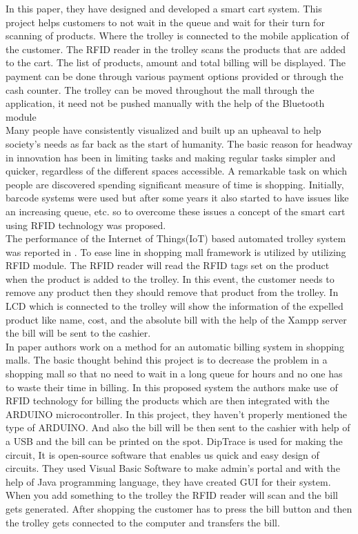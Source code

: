 \documentclass[conference]{IEEEtran}
\begin{document}
In this paper\cite{b8}, they have designed and developed a smart cart system. This project helps customers to not wait in the queue and wait for their turn for scanning of products. Where the trolley is connected 
to the mobile application of the customer. The RFID reader in the trolley scans the products that are added to the cart. The list of products, amount and total billing will be displayed. The payment can be done 
through various payment options provided or through the cash counter. The trolley can be moved throughout the mall through the application, it need not be pushed manually with the help of the Bluetooth module\\

Many people have consistently visualized and built up an upheaval to help society's needs as far back as the start of humanity. The basic reason for headway in innovation has been in limiting tasks and making regular tasks simpler and quicker, regardless of the different spaces accessible. A remarkable task on which people are discovered spending significant measure of time is shopping. Initially, barcode systems were used but after some years it also started to have issues like an increasing queue, etc. so to overcome these issues a concept of the smart cart using RFID technology was proposed.\\

The performance of the Internet of Things(IoT) based automated trolley system was reported in \cite{b9}. To ease line in shopping mall framework is utilized by utilizing RFID module. The RFID reader will read the RFID tags set on the product when the product is added to the trolley. In this event, the customer needs to remove any product then they should remove that product from the trolley. In LCD which is connected to the trolley will show the information of the expelled product like name, cost, and the absolute bill with the help of the Xampp server the bill will be sent to the cashier.\\


In paper\cite{b10} authors work on a method for an automatic billing system in shopping malls. The basic thought behind this project is to decrease the problem in a shopping mall so that no need to wait in a long queue for hours and no one has to waste their time in billing. In this proposed system the authors make use of RFID technology for billing the products which are then integrated with the ARDUINO microcontroller. In this project, they haven't properly mentioned the type of ARDUINO. And also the bill will be then sent to the cashier with help of a USB and the bill can be printed on the spot. DipTrace is used for making the circuit, It is open-source software that enables us quick and easy design of circuits. They used Visual Basic Software to make admin's portal and with the help of Java programming language, they have created GUI for their system. When you add something to the trolley the RFID reader will scan and the bill gets generated. After shopping the customer has to press the bill button and then the trolley gets connected to the computer and transfers the bill.\\ 
\end{document}
